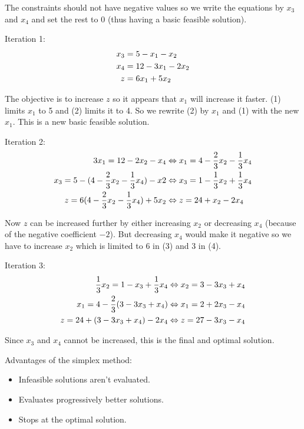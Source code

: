 \documentclass[a4paper, 12pt]{article}
\begin{document}
The constraints should not have negative values so we write the equations by
$x_3$ and $x_4$ and set the rest to 0 (thus having a basic feasible solution).

Iteration 1:
\setcounter{equation}{0}
\begin{align}
    x_3 &= 5 - x_1 - x_2 \\
    x_4 &= 12 - 3x_1 - 2x_2 \\
    z &= 6x_1 + 5x_2 \notag
\end{align}

The objective is to increase $z$ so it appears that $x_1$ will increase it
faster. (1) limits $x_1$ to 5 and (2) limits it to 4. So we rewrite (2) by
$x_1$ and (1) with the new $x_1$. This is a new basic feasible solution.

Iteration 2:
\begin{align}
    3x_1 = 12 - 2x_2 - x_4 &\Leftrightarrow
        x_1 = 4 - \frac{2}{3}x_2 - \frac{1}{3}x_4 \\
    x_3 = 5 - (4 - \frac{2}{3}x_2 - \frac{1}{3}x_4) - x2 &\Leftrightarrow
        x_3 = 1 - \frac{1}{3}x_2 + \frac{1}{3}x_4 \\
    z = 6 (4 - \frac{2}{3}x_2 - \frac{1}{3}x_4) + 5x_2 &\Leftrightarrow
        z = 24 + x_2 - 2x_4 \notag
\end{align}

Now $z$ can be increased further by either increasing $x_2$ or decreasing $x_4$
(because of the negative coefficient $-2$). But decreasing $x_4$ would make it
negative so we have to increase $x_2$ which is limited to 6 in (3) and 3 in (4).

Iteration 3:
\begin{align}
    \frac{1}{3}x_2 = 1 - x_3 + \frac{1}{3}x_4 &\Leftrightarrow
        x_2 = 3 - 3x_3 + x_4 \\
    x_1 = 4 - \frac{2}{3}(3 - 3x_3 + x_4) &\Leftrightarrow
        x_1 = 2 + 2x_3 - x_4 \\
    z = 24 + (3 - 3x_3 + x_4) - 2x_4 &\Leftrightarrow
        z = 27 - 3x_3 - x_4 \notag
\end{align}

Since $x_3$ and $x_4$ cannot be increased, this is the final and optimal
solution.

Advantages of the simplex method:

\begin{itemize}
    \item Infeasible solutions aren't evaluated.
    \item Evaluates progressively better solutions.
    \item Stops at the optimal solution.
\end{itemize}
\end{document}
